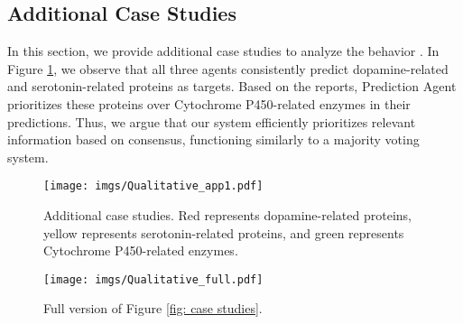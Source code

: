 \clearpage
\subsection{Additional Case Studies}
\label{app: additional case studies}
In this section, we provide additional case studies to analyze the behavior \proposed.
In Figure \ref{app fig: qualitative}, we observe that all three agents consistently predict dopamine-related and serotonin-related proteins as targets.
Based on the reports, Prediction Agent prioritizes these proteins over Cytochrome P450-related enzymes in their predictions.
Thus, we argue that our system efficiently prioritizes relevant information based on consensus, functioning similarly to a majority voting system.

\begin{figure}[h]
    \centering
    \texttt{[image: imgs/Qualitative\_app1.pdf]}
    \caption{Additional case studies. Red represents dopamine-related proteins, yellow represents serotonin-related proteins, and green represents Cytochrome P450-related enzymes.}
    \label{app fig: qualitative}
\end{figure}

\begin{figure}[h]
    \centering
    \texttt{[image: imgs/Qualitative\_full.pdf]}
    \caption{Full version of Figure \ref{fig: case studies}.}
    \label{app fig: qualitative full}
\end{figure}


